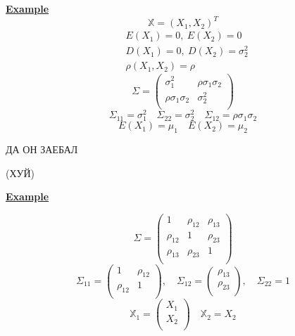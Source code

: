 \documentclass[a4paper]{article}
\begin{document}
\textbf{\underline{Example}}
\[
    \mathbb{X} = (X_1, X_2)^{T}
\]
\[
    \begin{aligned}
        &E(X_1) = 0, \ E(X_2) = 0\\
        &D(X_1) = 0, \ D(X_2) = \sigma_2^2\\
        &\rho(X_1, X_2) = \rho
    \end{aligned}
\]
\[
    \Sigma =
    \begin{pmatrix}
    \sigma_1^2 & \rho \sigma_1 \sigma_2\\
    \rho \sigma_1 \sigma_2 & \sigma_2^2\\
    
    \end{pmatrix}
\]
\[
    \Sigma_{11} = \sigma_1^2 \quad \Sigma_{22} = \sigma_2^2 \quad \Sigma_{12} = \rho
    \sigma_1 \sigma_2
\]
\[
    E(X_1) = \mu_1 \quad E(X_2) = \mu_2
\]

ДА ОН ЗАЕБАЛ

(ХУЙ)

\textbf{\underline{Example}}

\[
    \Sigma = 
    \begin{pmatrix}
    1 & \rho_{12} & \rho_{13}\\
    \rho_{12} & 1 & \rho_{23}\\
    \rho_{13} & \rho_{23} & 1\\
    
    \end{pmatrix}
\]
\[
    \Sigma_{11} = \begin{pmatrix}
    1 & \rho_{12}\\
    \rho_{12} & 1\\
    
    \end{pmatrix},
    \quad \Sigma_{12} = 
    \begin{pmatrix}
    \rho_{13}\\
    \rho_{23}\\
    
    \end{pmatrix}, \quad
    \Sigma_{22}= 1
\]
\[
    \mathbb{X}_1 = \begin{pmatrix}
    X_1\\
    X_2\\
    
    \end{pmatrix} \quad
    \mathbb{X}_2 = X_2
\]
\end{document}
